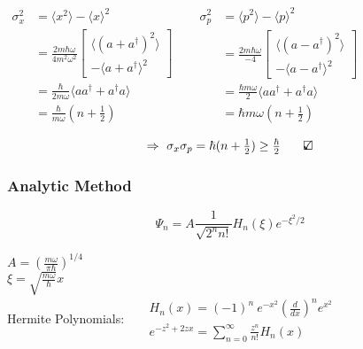 \documentclass[12pt]{article}
\newcommand{\checkedbox}{\mbox{\ooalign{$\checkmark$\cr\hidewidth$\square$\hidewidth\cr}}} %
\begin{document}
\begin{minipage}[t]{.51\textwidth}
    \vspace{15pt} \noindent
    \( \begin{aligned}
        \sigma_x^2 &= \langle x^2 \rangle 
            - \langle x \rangle^2 
            \\[5pt]
        &= \tfrac{ 2 m \hbar \omega }{4 m^2 \omega^2} 
            \left[ \begin{aligned}
                \langle (a + a^\dagger)^2 \rangle \\
                - \langle a + a^\dagger \rangle^2 
            \end{aligned} \right]
            \\[5pt]
        &= \tfrac{\hbar}{2 m \omega} \langle a a^\dagger + a^\dagger a \rangle \\[5pt]
        &= \tfrac{\hbar}{m \omega} (n + \tfrac{1}{2}) 
    \end{aligned} \) 
    \ \ 
    \( \begin{aligned}
        \sigma_p^2 &= \langle p^2 \rangle 
            - \langle p \rangle^2 
            \\[5pt]
        &= \tfrac{ 2 m \hbar \omega }{-4} 
            \left[ \begin{aligned}
                \langle (a - a^\dagger)^2 \rangle \\
                - \langle a - a^\dagger \rangle^2 
            \end{aligned} \right]
            \\[5pt]
        &= \tfrac{\hbar m \omega}{2} \langle a a^\dagger + a^\dagger a \rangle \\[5pt]
        &= \hbar m \omega (n + \tfrac{1}{2}) 
    \end{aligned} \)
    
    \[ \Rightarrow \ \sigma_x \sigma_p = \hbar (n+ \tfrac{1}{2}) \geq \tfrac{\hbar}{2} 
        \hspace{18pt} \checkedbox \]
\end{minipage}

\vspace{20pt}
\subsubsection{Analytic Method}

\boldmath \[ \Psi_n = A \frac{1}{\sqrt{2^n n!}} H_n(\xi) e^{- \xi^2 / 2} \] \unboldmath

\vspace{5pt}\noindent
\( A = \left( \frac{m \omega }{\pi \hbar} \right)^{1/4} \) \\[10pt]
\( \xi = \sqrt{ \frac{m \omega }{\hbar} } x\) \\[10pt]
Hermite Polynomials: \ \( \begin{aligned}
    &H_n(x) = (-1)^n \ e^{-x^2} \left( \frac{d}{dx} \right)^n e^{x^2}\\[5pt]
    &e^{-z^2 + 2zx} = \sum_{n=0}^\infty \frac{z^n}{n!} H_n(x)
\end{aligned} \)
\end{document}
